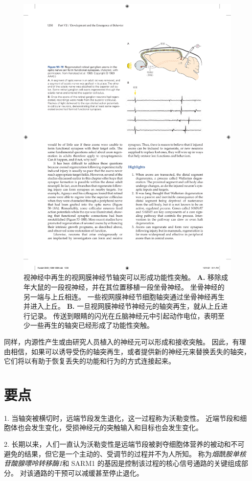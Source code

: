 \begin{figure}[htbp]
	\centering
	\includegraphics[width=0.65\linewidth]{chap50/fig_50_18}
	\caption{视神经中再生的视网膜神经节轴突可以形成功能性突触\cite{keirstead1989electrophysiologic}。
		\textbf{A.} 移除成年大鼠的一段视神经，并在其位置移植一段坐骨神经。
		坐骨神经的另一端与上丘相连。
		一些视网膜神经节细胞轴突通过坐骨神经再生并进入上丘。
		\textbf{B.} 一旦视网膜神经节神经元的轴突再生，就从上丘进行记录。
		传送到眼睛的闪光在丘脑神经元中引起动作电位，表明至少一些再生的轴突已经形成了功能性突触。}
	\label{fig:50_18}
\end{figure}


同样，内源性产生或由研究人员植入的神经元可以形成和接收突触。
因此，有理由相信，如果可以诱导受伤的轴突再生，或者提供新的神经元来替换丢失的轴突，它们将以有助于恢复丢失的功能和行为的方式连接起来。



\section{要点}

1. 当轴突被横切时，远端节段发生退化，这一过程称为沃勒变性。
近端节段和细胞体也会发生变化，受损神经元的突触输入和目标也会发生变化。


2. 长期以来，人们一直认为沃勒变性是远端节段被剥夺细胞体营养的被动和不可避免的结果，但它是一个主动的、受调节的过程并不为人所知。
称为\textit{烟酰胺单核苷酸腺嘌呤转移酶1}和 SARM1 的基因是控制该过程的核心信号通路的关键组成部分。
对该通路的干预可以减缓甚至停止退化。 


